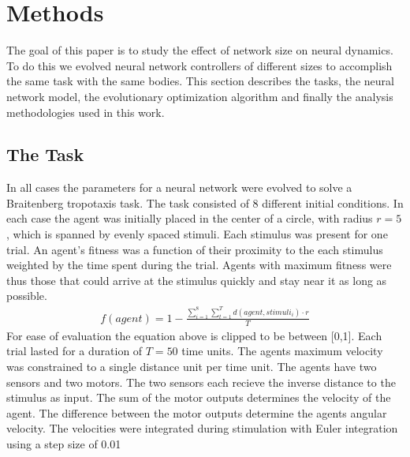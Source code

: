 \documentclass[letterpaper]{article}
\begin{document}
\section{Methods}
The goal of this paper is to study the effect of network size 
on neural dynamics. To do this we evolved neural network controllers
of different sizes to accomplish the same task with the same bodies.
This section describes the tasks, the neural network model, 
the evolutionary optimization algorithm and finally
the analysis methodologies used in this work.

\subsection{The Task}
In all cases the parameters for a neural network were evolved to 
solve a Braitenberg tropotaxis task. The task consisted of 8 different 
initial conditions. In each case the agent was initially placed in the 
center of a circle, with radius $r=5$, which is spanned by evenly spaced stimuli. Each
stimulus was present for one trial. An agent's fitness was a function
of their proximity to the each stimulus weighted by the time spent during the
trial. Agents with maximum fitness were thus those that could arrive at
the stimulus quickly and stay near it as long as possible. 
\begin{eqnarray}
  f(agent) = 1 - \frac{\sum^8_{i=1}\sum^T_{t=1}d(agent,stimuli_i)\cdot r}{T}
\end{eqnarray}
For ease of evaluation the equation above is clipped to be between [0,1].
Each trial lasted
for a duration of $T=50$ time units. The agents maximum velocity was constrained to
a single distance unit per time unit.
The agents have two sensors and two motors. The two sensors each recieve the inverse
distance to the stimulus as input.
The sum of the motor outputs determines the velocity of the agent. The difference
between the motor outputs determine the agents angular velocity. The velocities
were integrated during stimulation with Euler integration using a step size of 0.01
\end{document}
